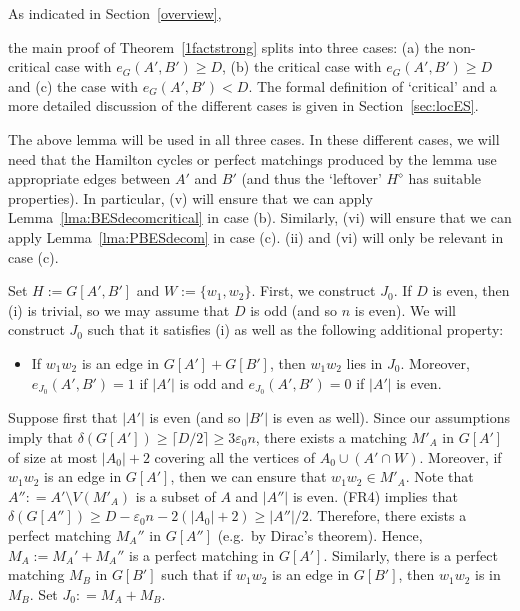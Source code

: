 \documentclass{memo-l}
\def\COMMENT#1{}
\def\eps{\varepsilon}
\def\epszero{\eps_0}
\numberwithin{section}{chapter}
\numberwithin{equation}{section}
\numberwithin{firstthm}{section}
\numberwithin{figure}{section}
\begin{document}
As indicated in Section~\ref{overview},%
	\COMMENT{Deryk: added pointer to Sec 11.}
 the main proof of Theorem~\ref{1factstrong} splits into three cases: (a) the non-critical case with $e_G(A',B') \ge D$,
(b) the critical case with $e_G(A',B') \ge D$ and (c) the case with $e_G(A',B') < D$.
The formal definition of `critical' and a more detailed discussion of the different cases is given in Section~\ref{sec:locES}.

The above lemma will be used in all three cases.
In these different cases, we will need that the Hamilton cycles or perfect matchings produced by the lemma use
appropriate edges between $A'$ and $B'$ (and thus the `leftover' $H^\diamond$ has suitable properties).
In particular, (v) will ensure that we can apply Lemma~\ref{lma:BESdecomcritical} in case (b).
Similarly, (vi) will ensure that we can apply Lemma~\ref{lma:PBESdecom} in case (c).
(ii) and (vi) will only be relevant in case (c).

\removelastskip{}\medskip{}
Set $H := G[A',B']$ and $W:= \{w_1,w_2\}$.
First, we construct $J_0$.
If $D$ is even, then (i) is trivial, so we may assume that $D$ is odd (and so $n$ is even). 
We will construct $J_0$ such that it satisfies (i) as well as the following additional property: 
\begin{itemize}
	\item[(i$'$)] If $ w_1w_2$ is an edge in $G[A']+G[B']$, then $w_1w_2$ lies in $J_0$. Moreover, $e_{J_0}(A',B')=1$ if $|A'|$ is odd
and $e_{J_0}(A',B')=0$ if $|A'|$ is even.
\end{itemize}
Suppose first that $|A'|$ is even (and so $|B'|$ is even as well).
Since our assumptions imply that $\delta(G[A']) \ge \lceil D/2 \rceil \ge 3 \epszero n $, there exists a matching $M'_A$ in $G[A']$ of size at
most $|A_0| + 2$ covering all the vertices of $A_0 \cup (A' \cap W)$.
Moreover, if $w_1w_2$ is an edge in $G[A']$, then we can ensure that $w_1w_2\in M'_A$.
Note that $A'' : = A' \setminus V(M'_A)$ is a subset of $A$ and $|A''|$ is even. 
(FR4) implies that $\delta(G[A'']) \ge D - \epszero n - 2(|A_0|+2) \ge |A''|/2$.
Therefore, there exists a perfect matching $M_A''$ in $G[A'']$ (e.g.~by Dirac's theorem).
Hence, $M_A:= M_A' + M_A''$ is a perfect matching in $G[A']$.
Similarly, there is a perfect matching $M_B$ in $G[B']$ such that if $w_1w_2$ is an edge in $G[B']$, then $w_1w_2$ is in $M_B$.
Set $J_0: = M_A + M_B$.
\end{document}
